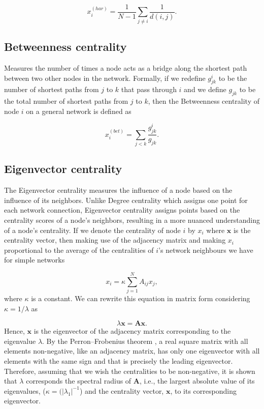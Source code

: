 \begin{equation}
    x_i^{(har)}= \frac{1}{N-1}\sum_{j\ne i}^{}\frac{1}{d(i,j)}.
\end{equation}

\subsection*{Betweenness centrality} Measures the number of times a node acts as a bridge along the shortest path between two other nodes in the network. Formally, if we redefine $g_{jk}^i$ to be the number of shortest paths from $j$ to $k$ that pass through $i$ and we define $g_{jk}$ to be the total number of shortest paths from $j$ to $k$, then the Betweenness centrality of node $i$ on a general network is defined as

\begin{equation}
    x_i^{(bet)}= \sum_{j<k}^{}\frac{g_{jk}^i}{g_{jk}}.
\end{equation}

\subsection*{Eigenvector centrality} The Eigenvector centrality measures the influence of a node based on the influence of its neighbors. Unlike Degree centrality which assigns one point for each network connection, Eigenvector centrality assigns points based on the centrality scores of a node's neighbors, resulting in a more nuanced understanding of a node's centrality. If we denote the centrality of node $i$ by $x_i$ where $\mathbf{x}$ is the centrality vector, then making use of the adjacency matrix and making $x_i$ proportional to the average of the centralities of $i$’s network neighbours we have for simple networks

\begin{equation}
\label{eqn:eigc}
    x_i= \kappa\sum_{j=1}^{N}A_{ij}x_j,
\end{equation}
where $\kappa$ is a constant. We can rewrite this equation in matrix form considering $\kappa=1/\lambda$ as

\begin{equation}
    \lambda \mathbf{x} = \mathbf{A}\mathbf{x}.
\end{equation}
Hence, $\mathbf{x}$ is the eigenvector of the adjacency matrix corresponding to the eigenvalue $\lambda$. By the Perron–Frobenius theorem \cite[Ch.\ 8]{meyer2000matrix}, a real square matrix with all elements non-negative, like an adjacency matrix, has only one eigenvector with all elements with the same sign and that is precisely the leading eigenvector. Therefore, assuming that we wish the centralities to be non-negative, it is shown that $\lambda$ corresponds the spectral radius of $\mathbf{A}$, i.e., the largest absolute value of its eigenvalues, ($\kappa=(\lvert \lambda_1 \rvert^{-1}$) and the centrality vector, $\mathbf{x}$, to its corresponding eigenvector.

